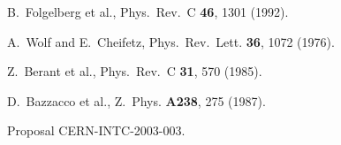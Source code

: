 \documentclass[aps,twocolumn,superscriptaddress,prc,showpacs]{revtex4}
\begin{document}
\begin{thebibliography}{9}
 B.~Folgelberg et al., Phys.~Rev.~C {\bf 46}, 1301 (1992).

 A.~Wolf and E.~Cheifetz, Phys.~Rev.~Lett. {\bf 36}, 1072 (1976).

 Z.~Berant et al., Phys.~Rev.~C {\bf 31}, 570 (1985).

 D.~Bazzacco et al., Z.~Phys. {\bf A238}, 275 (1987).
  

 Proposal CERN-INTC-2003-003.
\end{thebibliography}
\end{document}
